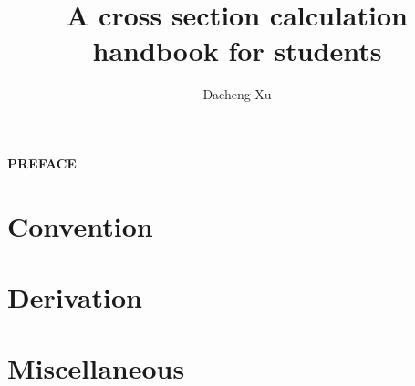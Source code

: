 \documentclass[titlepage]{book}
\title{\textbf{\huge{A cross section calculation handbook for students}}}
\author{
    Dacheng Xu
}
\date{}
\begin{document}

\maketitle


\begin{center}
    \textbf{\Large{PREFACE}}
\end{center}




\pagestyle{empty}
\renewcommand{\baselinestretch}{0.94}\normalsize
\tableofcontents
\renewcommand{\baselinestretch}{1.0}\normalsize
\restoregeometry
\pagestyle{fancy}

\clearpage



\section{Convention}


\section{Derivation}





\section{Miscellaneous}


% 



\end{document}
